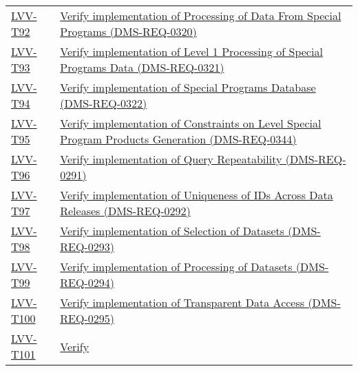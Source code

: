\begin{longtable}[]{p{3cm}p{13cm}}
\protect\hyperlink{lvv-t92---verify-implementation-of-processing-of-data-from-special-programs-dms-req-0320}{LVV-T92}
&
\href{https://jira.lsstcorp.org/secure/Tests.jspa\#/testCase/LVV-T92}{Verify
implementation of Processing of Data From Special Programs
(DMS-REQ-0320)}\tabularnewline
\protect\hyperlink{lvv-t93---verify-implementation-of-level-1-processing-of-special-programs-data-dms-req-0321}{LVV-T93}
&
\href{https://jira.lsstcorp.org/secure/Tests.jspa\#/testCase/LVV-T93}{Verify
implementation of Level 1 Processing of Special Programs Data
(DMS-REQ-0321)}\tabularnewline
\protect\hyperlink{lvv-t94---verify-implementation-of-special-programs-database-dms-req-0322}{LVV-T94}
&
\href{https://jira.lsstcorp.org/secure/Tests.jspa\#/testCase/LVV-T94}{Verify
implementation of Special Programs Database
(DMS-REQ-0322)}\tabularnewline
\protect\hyperlink{lvv-t95---verify-implementation-of-constraints-on-level-special-program-products-generation-dms-req-0344}{LVV-T95}
&
\href{https://jira.lsstcorp.org/secure/Tests.jspa\#/testCase/LVV-T95}{Verify
implementation of Constraints on Level Special Program Products
Generation (DMS-REQ-0344)}\tabularnewline
\protect\hyperlink{lvv-t96---verify-implementation-of-query-repeatability-dms-req-0291}{LVV-T96}
&
\href{https://jira.lsstcorp.org/secure/Tests.jspa\#/testCase/LVV-T96}{Verify
implementation of Query Repeatability (DMS-REQ-0291)}\tabularnewline
\protect\hyperlink{lvv-t97---verify-implementation-of-uniqueness-of-ids-across-data-releases--dms-req-0292}{LVV-T97}
&
\href{https://jira.lsstcorp.org/secure/Tests.jspa\#/testCase/LVV-T97}{Verify
implementation of Uniqueness of IDs Across Data Releases
(DMS-REQ-0292)}\tabularnewline
\protect\hyperlink{lvv-t98---verify-implementation-of-selection-of-datasets-dms-req-0293}{LVV-T98}
&
\href{https://jira.lsstcorp.org/secure/Tests.jspa\#/testCase/LVV-T98}{Verify
implementation of Selection of Datasets (DMS-REQ-0293)}\tabularnewline
\protect\hyperlink{lvv-t99---verify-implementation-of-processing-of-datasets-dms-req-0294}{LVV-T99}
&
\href{https://jira.lsstcorp.org/secure/Tests.jspa\#/testCase/LVV-T99}{Verify
implementation of Processing of Datasets (DMS-REQ-0294)}\tabularnewline
\protect\hyperlink{lvv-t100---verify-implementation-of-transparent-data-access-dms-req-0295}{LVV-T100}
&
\href{https://jira.lsstcorp.org/secure/Tests.jspa\#/testCase/LVV-T100}{Verify
implementation of Transparent Data Access (DMS-REQ-0295)}\tabularnewline
\protect\hyperlink{lvv-t101---verify-implementation-of-transient-alert-distribution-dms-req-0002}{LVV-T101}
&
\href{https://jira.lsstcorp.org/secure/Tests.jspa\#/testCase/LVV-T101}{Verify
}
\end{longtable}
